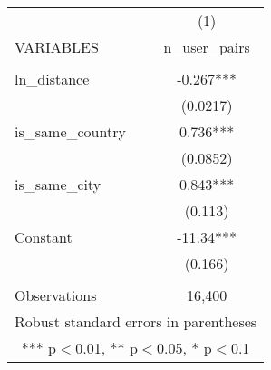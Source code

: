 \begin{tabular}{lc} \hline
 & (1) \\
VARIABLES & n\_user\_pairs \\ \hline
 &  \\
ln\_distance & -0.267*** \\
 & (0.0217) \\
is\_same\_country & 0.736*** \\
 & (0.0852) \\
is\_same\_city & 0.843*** \\
 & (0.113) \\
Constant & -11.34*** \\
 & (0.166) \\
 &  \\
 Observations & 16,400 \\ \hline
\multicolumn{2}{c}{ Robust standard errors in parentheses} \\
\multicolumn{2}{c}{ *** p$<$0.01, ** p$<$0.05, * p$<$0.1} \\
\end{tabular}
